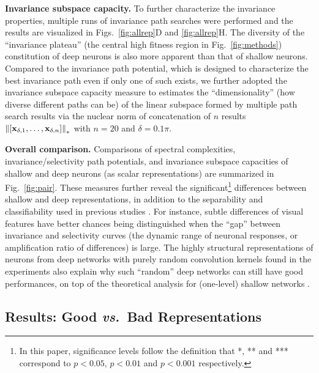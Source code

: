 \documentclass[10pt,twocolumn,letterpaper]{article}
\begin{document}
{\bf Invariance subspace capacity.} To further characterize the invariance properties, multiple runs of invariance path searches {were} performed and the results are visualized in Figs.~\ref{fig:allrep}D and \ref{fig:allrep}H.
The diversity of the ``invariance plateau'' (\eg the central high fitness region in Fig.~\ref{fig:methods}) constitution of deep neurons is also more apparent than that of shallow neurons.
Compared to the invariance path potential, which is designed to characterize the best invariance path even if only one of such exists, we further adopted the invariance subspace capacity measure to estimates the ``dimensionality'' (\ie how diverse different paths can be) of the linear subspace formed by multiple path search results via the nuclear norm of concatenation of $n$ results $\left\|\left[{\bf{x}}_{\delta,1},\dots,{\bf{x}}_{\delta,n}\right]\right\|_{*}$ with $n=20$ and $\delta=0.1\pi$.


\newcommand{\defstars}{In this paper, significance levels follow the definition that *, ** and *** correspond to $p<0.05$, $p<0.01$ and $p<0.001$ respectively.\label{fnote:defstars}}

{\bf Overall comparison.} Comparisons of spectral complexities, invariance/selectivity path potentials, and invariance subspace capacities of shallow and deep neurons (as scalar representations) are summarized in Fig.~\ref{fig:pair}.
These measures further reveal the significant\footnote{\defstars} differences between shallow and deep representations, in addition to the separability and classifiability used in previous studies \cite{donahue2014decaf, zeiler2014visualizing}.
For instance, subtle differences of visual features have better chances being distinguished when the ``gap'' between invariance and selectivity curves (\ie the dynamic range of neuronal responses, or amplification ratio of differences) is large. 
The highly structural representations of neurons from deep networks with purely random convolution kernels found in the experiments also explain why such ``random'' deep networks can still have good performances, on top of the theoretical analysis for (one-level) shallow networks \cite{saxe2011random}.


\subsection{Results: Good \textbf{\textit{vs.}}~Bad Representations}
\end{document}
